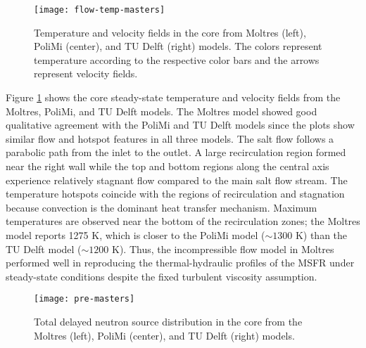 \begin{figure}[htb!]
    \centering
    \texttt{[image: flow-temp-masters]}
    \caption{Temperature and velocity fields in the core from Moltres
    (left), PoliMi (center), and TU Delft (right) models. The colors represent
    temperature according to the respective color bars and the arrows
    represent velocity fields. \cite{park_advancement_2020}}
    \label{fig:flow-temp}
\end{figure}

Figure \ref{fig:flow-temp} shows the core steady-state temperature and velocity
fields from the Moltres, PoliMi, and TU Delft models. The Moltres
model showed
good qualitative agreement with the PoliMi and TU Delft models since the plots
show similar flow and hotspot features in all three models. The salt flow
follows a parabolic path from the inlet to the outlet. A large
recirculation region formed near the right wall while the top and bottom
regions along the central axis experience relatively stagnant flow compared to
the main salt flow stream. The temperature hotspots coincide with the regions of
recirculation and stagnation because convection is the dominant heat transfer
mechanism. Maximum temperatures are observed near the bottom of the
recirculation zones; the Moltres model reports 1275 K, which is closer to the
PoliMi model ($\sim1300$ K) than the TU Delft model ($\sim1200$ K). Thus, the
incompressible flow model in Moltres performed well in reproducing the
thermal-hydraulic profiles of the \gls{MSFR} under steady-state conditions
despite the fixed turbulent viscosity assumption.

\begin{figure}[b!]
    \centering
    \texttt{[image: pre-masters]}
    \caption{Total delayed neutron source distribution in the core from the
    Moltres (left), PoliMi (center), and TU Delft (right) models.}
    \label{fig:pre}
\end{figure}

